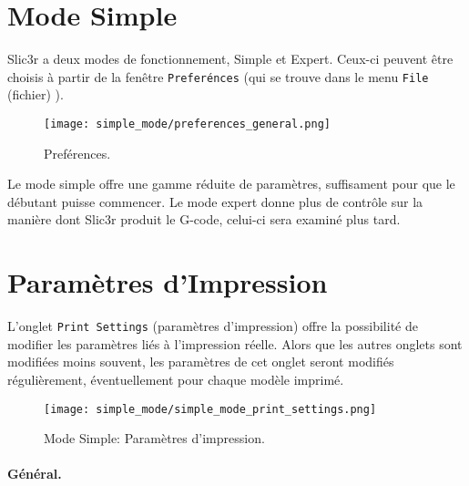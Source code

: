 \section{Mode Simple} %
\label{sec:simple_mode}

Slic3r a deux modes de fonctionnement, Simple et Expert. Ceux-ci peuvent \^etre choisis \`a partir de la fen\^etre \texttt{Prefer\'ences} (qui se trouve dans le menu  \texttt{File} (fichier) ).

\begin{figure}[ht]
\centering
\texttt{[image: simple\_mode/preferences\_general.png]}
\caption{Pref\'erences.}
\label{fig:preferences_general}
\end{figure}

Le mode simple offre une gamme r\'eduite de param\`etres, suffisament pour que le d\'ebutant puisse commencer. Le mode expert donne plus de contr\^ole sur la mani\`ere dont Slic3r produit le G-code, celui-ci sera examin\'e plus tard.

\section{Param\`etres d'Impression}

L'onglet \texttt{Print Settings} (param\`etres d'impression) 
offre la possibilit\'e de modifier les param\`etres li\'es \`a l'impression r\'eelle. Alors que les autres onglets sont modifi\'ees moins souvent, les param\`etres de cet onglet seront modifi\'es r\'eguli\`erement, \'eventuellement pour chaque mod\`ele imprim\'e.

\begin{figure}[ht]
\centering
\texttt{[image: simple\_mode/simple\_mode\_print\_settings.png]}
\caption{Mode Simple: Param\`etres d'impression.}
\label{fig:simple_mode_print_settings}
\end{figure}

\paragraph{G\'en\'eral.} %
\label{par:simple_general}


